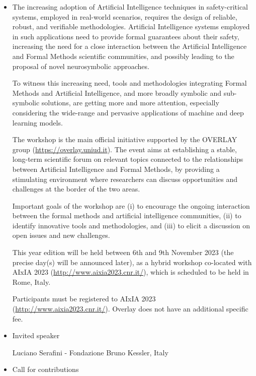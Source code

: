 \documentclass[prodmode,acmtecs]{acmsmall} %
\begin{document}
\begin{itemize}\item   The increasing adoption of Artificial Intelligence techniques in safety-critical systems, employed in real-world scenarios, requires the design of reliable, robust, and verifiable methodologies. Artificial Intelligence systems employed in such applications need to provide formal guarantees about their safety, increasing the need for a close interaction between the Artificial Intelligence and Formal Methods scientific communities, and possibly leading to the proposal of novel neurosymbolic approaches. 
 
  To witness this increasing need, tools and methodologies integrating Formal Methods and Artificial Intelligence, and more broadly symbolic and sub-symbolic solutions, are getting more and more attention, especially considering the wide-range and pervasive applications of machine and deep learning models. 
 
  The workshop is the main official initiative supported by the OVERLAY group (\href{https://overlay.uniud.it}{https://overlay.uniud.it}). The event aims at establishing a stable, long-term scientific forum on relevant topics connected to the relationships between Artificial Intelligence and Formal Methods, by providing a stimulating environment where researchers can discuss opportunities and challenges at the border of the two areas.  
 
  Important goals of the workshop are (i) to encourage the ongoing interaction between the formal methods and artificial intelligence communities, (ii) to identify innovative tools and methodologies, and (iii) to elicit a discussion on open issues and new challenges. 
 
  This year edition will be held between 6th and 9th November 2023 (the precise day(s) will be announced later), as a hybrid workshop co-located with AIxIA 2023 (\href{http://www.aixia2023.cnr.it/}{http://www.aixia2023.cnr.it/}), which is scheduled to be held in Rome, Italy. 
 
  Participants must be registered to AIxIA 2023 (\href{http://www.aixia2023.cnr.it/}{http://www.aixia2023.cnr.it/}). Overlay does not have an additional specific fee. 
 
\item  Invited speaker  
 
  Luciano Serafini - Fondazione Bruno Kessler, Italy 
 
\item  Call for contributions   
 

\end{itemize}
\end{document}
